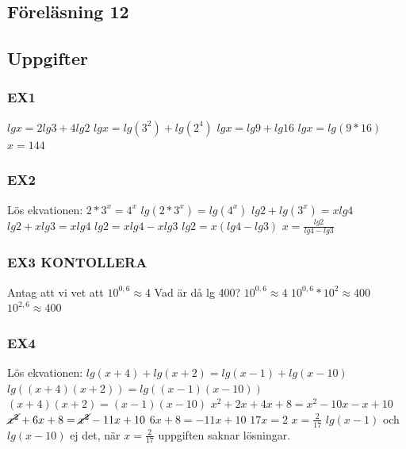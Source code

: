\documentclass[a4paper,10pt]{article}
\begin{document}
\begin{flushleft}
\section{Föreläsning 12}
  \subsection{Uppgifter}
  \subsubsection{EX1}
    $ lgx = 2lg3+4lg2 $\newline
    $ lgx = lg(3^2)+lg(2^4) $\newline
    $ lgx = lg9+lg16 $\newline
    $ lgx = lg(9*16) $\newline
    $ x = 144 $
  \subsubsection{EX2}
    Lös ekvationen:\newline
    $ 2*3^x=4^x $\newline
    $ lg(2*3^x) = lg(4^x) $\newline
    $ lg2+lg(3^x) = xlg4 $\newline
    $ lg2+xlg3 = xlg4 $\newline
    $ lg2 = xlg4-xlg3 $\newline
    $ lg2 = x(lg4-lg3) $\newline
    $ x = \frac{lg2}{lg4-lg3} $
  \subsubsection{EX3 KONTOLLERA}
    Antag att vi vet att $ 10^{0,6}\approx4 $\newline
    Vad är då lg 400?\newline
    $ 10^{0,6}\approx4 $\newline
    $ 10^{0,6}*10^2\approx400 $\newline
    $ 10^{2,6}\approx400 $\newline
  \subsubsection{EX4}
    Lös ekvationen:\newline
    $ lg(x+4)+lg(x+2) = lg(x-1)+lg(x-10) $\newline
    $ lg((x+4)(x+2)) = lg((x-1)(x-10)) $\newline
    $ (x+4)(x+2) = (x-1)(x-10) $\newline
    $ x^2+2x+4x+8 = x^2-10x-x+10 $\newline
    $ \cancel{x^2}+6x+8 = \cancel{x^2}-11x+10 $\newline
    $ 6x+8 = -11x+10 $\newline
    $ 17x = 2 $\newline
    $ x = \frac{2}{17} $\newline
    $ lg(x-1) $ och $ lg(x-10) $ ej det, när $ x=\frac{2}{17} $ uppgiften saknar lösningar.

\end{flushleft}
\end{document}
